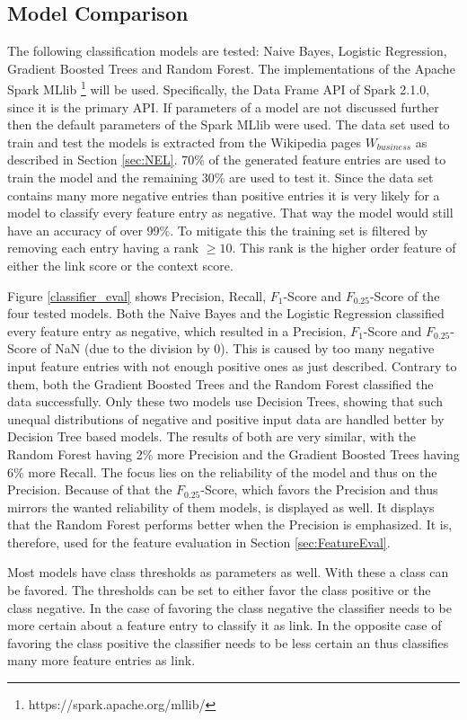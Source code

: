\subsection{Model Comparison}
The following classification models are tested: Naive Bayes, Logistic Regression, Gradient Boosted Trees and Random Forest. The implementations of the Apache Spark MLlib \footnote{https://spark.apache.org/mllib/} will be used. Specifically, the Data Frame API of Spark 2.1.0, since it is the primary API. If parameters of a model are not discussed further then the default parameters of the Spark  MLlib were used. The data set used to train and test the models is extracted from the Wikipedia pages $W_{business}$ as described in Section \ref{sec:NEL}. 70\% of the generated feature entries are used to train the model and the remaining 30\% are used to test it. Since the data set contains many more negative entries than positive entries it is very likely for a model to classify every feature entry as negative. That way the model would still have an accuracy of over 99\%. To mitigate this the training set is filtered by removing each entry having a rank $\geq 10$. This rank is the higher order feature of either the link score or the context score.\par
Figure \ref{classifier_eval} shows Precision, Recall, $F_1$-Score and $F_{0.25}$-Score of the four tested models. Both the Naive Bayes and the Logistic Regression classified every feature entry as negative, which resulted in a Precision, $F_1$-Score and $F_{0.25}$-Score of NaN (due to the division by 0). This is caused by too many negative input feature entries with not enough positive ones as just described. Contrary to them, both the Gradient Boosted Trees and the Random Forest classified the data successfully. Only these two models use Decision Trees, showing that such unequal distributions of negative and positive input data are handled better by Decision Tree based models. The results of both are very similar, with the Random Forest having 2\% more Precision and the Gradient Boosted Trees having 6\% more Recall. The focus lies on the reliability of the model and thus on the Precision. Because of that the $F_{0.25}$-Score, which favors the Precision and thus mirrors the wanted reliability of them models, is displayed as well. It displays that the Random Forest performs better when the Precision is emphasized. It is, therefore, used for the feature evaluation in Section \ref{sec:FeatureEval}.\par
Most models have class thresholds as parameters as well. With these a class can be favored. The thresholds can be set to either favor the class positive or the class negative. In the case of favoring the class negative the classifier needs to be more certain about a feature entry to classify it as link. In the opposite case of favoring the class positive the classifier needs to be less certain an thus classifies many more feature entries as link.\par
